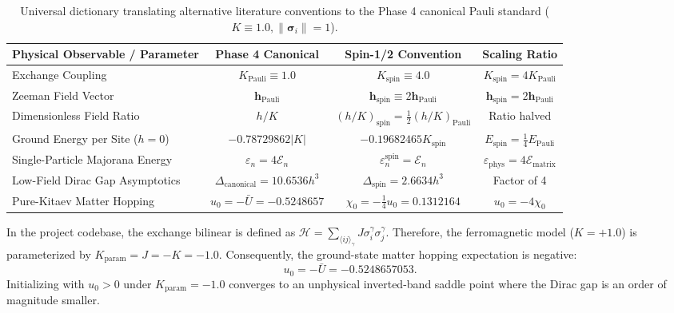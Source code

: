 \begin{table}[htbp]
\centering
\caption{Universal dictionary translating alternative literature conventions to the Phase 4 canonical Pauli standard ($K \equiv 1.0, \|\bm{\sigma}_i\| = 1$).}
\label{tab:phase4_dictionary}
\vspace{2mm}
\begin{tabular}{lccc}
\toprule
\textbf{Physical Observable / Parameter} & \textbf{Phase 4 Canonical} & \textbf{Spin-1/2 Convention} & \textbf{Scaling Ratio} \\
\midrule
Exchange Coupling & $K_{\mathrm{Pauli}} \equiv 1.0$ & $K_{\mathrm{spin}} \equiv 4.0$ & $K_{\mathrm{spin}} = 4 K_{\mathrm{Pauli}}$ \\
Zeeman Field Vector & $\bm{h}_{\mathrm{Pauli}}$ & $\bm{h}_{\mathrm{spin}} \equiv 2 \bm{h}_{\mathrm{Pauli}}$ & $\bm{h}_{\mathrm{spin}} = 2 \bm{h}_{\mathrm{Pauli}}$ \\
Dimensionless Field Ratio & $h / K$ & $(h/K)_{\mathrm{spin}} = \frac{1}{2} (h/K)_{\mathrm{Pauli}}$ & Ratio halved \\
Ground Energy per Site ($h=0$) & $-0.78729862 |K|$ & $-0.19682465 K_{\mathrm{spin}}$ & $E_{\mathrm{spin}} = \frac{1}{4} E_{\mathrm{Pauli}}$ \\
Single-Particle Majorana Energy & $\varepsilon_n = 4 \mathcal{E}_n$ & $\varepsilon_n^{\mathrm{spin}} = \mathcal{E}_n$ & $\varepsilon_{\mathrm{phys}} = 4 \mathcal{E}_{\mathrm{matrix}}$ \\
Low-Field Dirac Gap Asymptotics & $\Delta_{\mathrm{canonical}} = 10.6536 h^3$ & $\Delta_{\mathrm{spin}} = 2.6634 h^3$ & Factor of 4 \\
Pure-Kitaev Matter Hopping & $u_0 = -\bar{U} = -0.5248657$ & $\chi_0 = -\frac{1}{4} u_0 = 0.1312164$ & $u_0 = -4 \chi_0$ \\
\bottomrule
\end{tabular}
\end{table}

\begin{remark}
In the project codebase, the exchange bilinear is defined as $\mathcal{H} = \sum_{\langle ij \rangle_\gamma} J \sigma_i^\gamma \sigma_j^\gamma$. Therefore, the ferromagnetic model ($K = +1.0$) is parameterized by $K_{\mathrm{param}} = J = -K = -1.0$. Consequently, the ground-state matter hopping expectation is negative:
\begin{equation}
u_0 = -\bar{U} = -0.5248657053.
\end{equation}
Initializing with $u_0 > 0$ under $K_{\mathrm{param}} = -1.0$ converges to an unphysical inverted-band saddle point where the Dirac gap is an order of magnitude smaller.
\end{remark}

